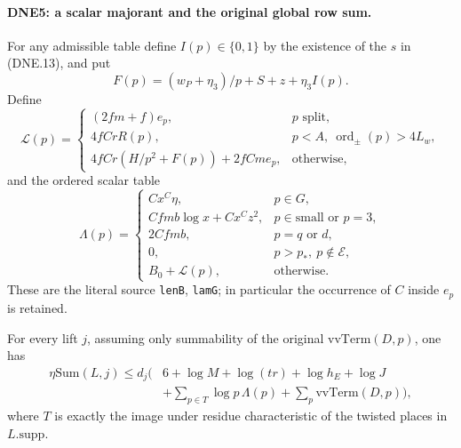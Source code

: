 \paragraph{DNE5: a scalar majorant and the original global row sum.}
\label{claim:DNE5}
For any admissible table define $I(p)\in\{0,1\}$ by the existence
of the $s$ in (DNE.13), and put
\[
 F(p)=(w_P+\eta_3)/p+S+z+\eta_3I(p).
\]
Define
\[
 \mathcal L(p)=
 \begin{cases}
 (2fm+f)e_p,&p\text{ split},\\
 4fCrR(p),&p<A,\ \operatorname{ord}_{\pm}(p)>4L_w,\\
 4fCr(H/p^2+F(p))+2fCm e_p,&\text{otherwise},
 \end{cases}                                                     \tag{DNE.17}
\]
and the ordered scalar table
\[
 \Lambda(p)=
 \begin{cases}
 Cx^C\eta,&p\in G,\\
 Cfm b\log x+Cx^Cz^2,&p\in\mathrm{small}\text{ or }p=3,\\
 2Cfm b,&p=q\text{ or }d,\\
 0,&p>p_*,\ p\notin\mathcal E,\\
 B_0+\mathcal L(p),&\text{otherwise}.
 \end{cases}                                                     \tag{DNE.18}
\]
These are the literal source \texttt{lenB}, \texttt{lamG}; in
particular the occurrence of $C$ inside $e_p$ is retained.

For every lift $j$, assuming only summability of the original
$\mathrm{vvTerm}(D,p)$, one has
\[
\begin{split}
 \eta\mathrm{Sum}(L,j)\le d_j\biggl(&6+\log M+\log(tr)
                      +\log h_E+\log J\\
             &+\sum_{p\in T}\log p\,\Lambda(p)
                         +\sum_p\mathrm{vvTerm}(D,p)\biggr),
\end{split}                                                       \tag{DNE.19}
\]
where $T$ is exactly the image under residue characteristic of the
twisted places in $L.\mathrm{supp}$.

